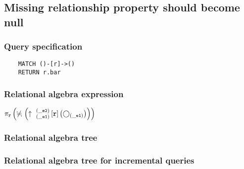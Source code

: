 	\subsection{Missing relationship property should become null}

	\subsubsection*{Query specification}

	\begin{lstlisting}
	MATCH ()-[r]->()
	RETURN r.bar
	\end{lstlisting}


	\subsubsection*{Relational algebra expression}

	$\projection{\var{r}} \left(\alldifferent{} \left(\expandout{\_e1}{\_e2}{}{r}{} \left(\getvertices{\_e1}{}\right)\right)\right)$

	\subsubsection*{Relational algebra tree}


	\subsubsection*{Relational algebra tree for incremental queries}

